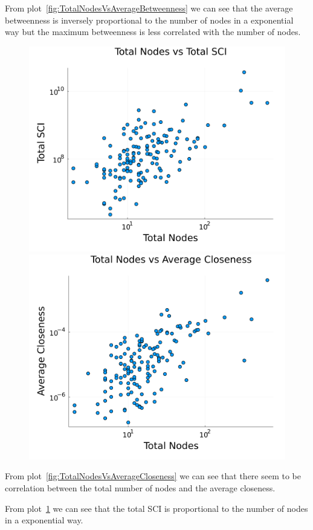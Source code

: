 From plot~\ref{fig:TotalNodesVsAverageBetweenness} we can see that the average betweenness is inversely proportional to the number of nodes in a exponential way but the maximum betweenness is less correlated with the number of nodes.

\begin{figure}[H]
    \centering
    \begin{minipage}{0.48\textwidth}
        \centering
        \includegraphics[width=1\textwidth]{images/task44/TotalNodesVsTotalSCI.png}
    \end{minipage}
    \begin{minipage}{0.5\textwidth}
        \centering
        \includegraphics[width=1\textwidth]{images/task44/TotalNodesVsAverageCloseness.png}
    \end{minipage}
    \caption{}
    \label{fig:TotalNodesVsAverageCloseness}
    \label{fig:TotalNodesVsTotalSCI}
\end{figure}

From plot~\ref{fig:TotalNodesVsAverageCloseness} we can see that there seem to be correlation between the total number of nodes and the average closeness.


From plot~\ref{fig:TotalNodesVsTotalSCI} we can see that the total SCI is proportional to the number of nodes in a exponential way.

\newpage